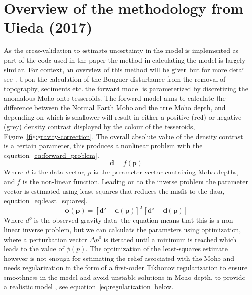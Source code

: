 \section{Overview of the methodology from Uieda (2017)}
As the cross-validation to estimate uncertainty in the model is implemented as part of the code used in the \cite{Uieda2016} paper the method in calculating the model is largely similar. For context, an overview of this method will be given but for more detail see \cite{Uieda2016}.
Upon the calculation of the Bouguer disturbance from the removal of topography, sediments etc. the forward model is parameterized by discretizing the anomalous Moho onto tesseroids. The forward model aims to calculate the difference between the Normal Earth Moho and the true Moho depth, and depending on which is shallower will result in either a positive (red) or negative (grey) density contrast displayed by the colour of the tesseroids, Figure~\ref{fig:gravity-correction}. The overall absolute value of the density contrast is a certain parameter, this produces a nonlinear problem with the equation~\ref{eq:forward_problem}.
\begin{equation}
  \mathbf{d} =
    f(\mathbf{p})
  \label{eq:forward_problem}
\end{equation}
Where $d$ is the data vector, $p$ is the parameter vector containing Moho depths, and $f$ is the non-linear function.
Leading on to the inverse problem the parameter vector is estimated using least-squares that reduces the misfit to the data, equation~\ref{eq:least_squares}.
\begin{equation}
  \mathbf{\phi}(\mathbf{p}) =
    {[\mathbf{d}^o - \mathbf{d}(\mathbf{p})]}^T
    [\mathbf{d}^o - \mathbf{d}(\mathbf{p})]
  \label{eq:least_squares}
\end{equation}
Where $d^o$ is the observed gravity data, the equation means that this is a non-linear inverse problem, but we can calculate the parameters using optimization, where a perturbation vector $\Delta p^0$ is iterated until a minimum is reached which leads to the value of $\phi(p)$.
The optimization of the least-squares estimate however is not enough for estimating the relief associated with the Moho and needs regularization in the form of a first-order Tikhonov regularization \cite{Tikhonov1977} to ensure smoothness in the model and avoid unstable solutions in Moho depth, to provide a realistic model \cite{Silva2001b}, see equation~\ref{eq:regularization} below.

